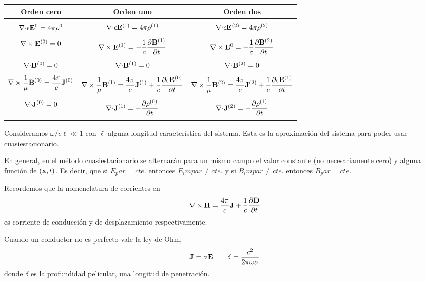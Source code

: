 \documentclass[10pt,oneside]{CBFT_book}
\begin{document}
\begin{table}
	\begin{center}
	\begin{tabular}{|c|c|c|}
	\hline
	Orden cero & Orden uno & Orden dos \\
	\hline
	& & \\
	$\displaystyle{ \divem{}\epsilon\vb{E}^0 = 4\pi\rho^0 }$ & $ \divem{}\epsilon\vb{E}^{(1)} = 4\pi\rho^{(1)} $ 
	& $ \divem{}\epsilon\vb{E}^{(2)} = 4\pi\rho^{(2)} $  \\
	& & \\
	$ \rotorm{}\vb{E}^{(0)} = 0 $ & $\displaystyle{\rotorm{}\vb{E}^{(1)} = -\frac{1}{c} \dpar{\vb{B}^{(1)}}{t} }$ 
	& $ \displaystyle{ \rotorm{}\vb{E}^0 = -\frac{1}{c} \dpar{\vb{B}^{(2)}}{t} }$  \\
	& & \\
	$ \divem{}\vb{B}^{(0)} = 0 $ & $\divem{}\vb{B}^{(1)} = 0  $ & $ \divem{}\vb{B}^{(2)} = 0 $  \\
	& & \\
	$ \displaystyle{ \rotorm{}\frac{1}{\mu}\vb{B}^{(0)} = \frac{4\pi}{c}\vb{J}^{(0)} } $ 
	& $ \displaystyle{ \rotorm{}\frac{1}{\mu}\vb{B}^{(1)} = \frac{4\pi}{c}\vb{J}^{(1)} + 
	\frac{1}{c}\dpar{\epsilon\vb{E}^{(0)}}{t} } $ 
	& $ \displaystyle{ \rotorm{}\frac{1}{\mu}\vb{B}^{(2)} = \frac{4\pi}{c}\vb{J}^{(2)} +
	\frac{1}{c}\dpar{\epsilon\vb{E}^{(1)}}{t} } $  \\
	& & \\
	$ \divem{}\vb{J}^{(0)} = 0 $ & $\displaystyle{ \divem{}\vb{J}^{(1)} = -\dpar{\rho^{(0)}}{t} }$ 
	& $\displaystyle{ \divem{}\vb{J}^{(2)} = -\dpar{\rho^{(1)}}{t} } $  \\
	& & \\
	\hline
	\end{tabular} 
	\end{center}  
\end{table}

Consideramos $\omega/c \ell \ll 1$ con $\ell$ alguna longitud característica del sistema.
Esta es la aproximación del sistema para poder usar cuasiestacionario.

En general, en el método cuasiestacionario se alternarán para un mismo campo el valor constante
(no necesariamente cero) y alguna función de $(\vb{x}, t)$. Es decir, que si $E_par = cte.$
entonces $E_impar \neq cte.$ y si $B_impar \neq cte.$ entonces $B_par = cte.$

Recordemos que la nomenclatura de corrientes en 
\[
	\rotorm{H} = \frac{4\pi}{c}\vb{J} + \frac{1}{c}\dpar{\vb{D}}{t}
\]
es corriente de conducción y de desplazamiento respectivamente.

Cuando un conductor no es perfecto vale la ley de Ohm,
\[
	\vb{J} = \sigma \vb{E} \qquad  \delta = \frac{c^2}{2\pi\omega\sigma}
\]
donde $\delta$ es la profundidad pelicular, una longitud de penetración.



\end{document}

